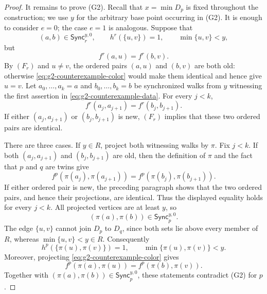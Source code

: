 \documentclass{amsart}
\numberwithin{equation}{section}
\theoremstyle{definition}
\theoremstyle{remark}
\begin{document}
\begin{proof}
It remains to prove (G2).  Recall that $x=\min D_p$ is fixed throughout
the construction; we use $y$ for the arbitrary base point occurring
in (G2).  It is enough to consider $e=0$; the case $e=1$ is analogous.
Suppose that
\begin{equation}\label{eq:g2-counterexample-data}
 (a,b)\in\mathsf{Sync}^{y,0}_r,\qquad h^r(\{u,v\})=1,\qquad
 \min\{u,v\}<y,
\end{equation}
but
\begin{equation}\label{eq:g2-counterexample-color}
 f^r(a,u)=f^r(b,v).
\end{equation}
By $(F_r)$ and $u\ne v$, the ordered pairs $(a,u)$ and $(b,v)$ are
both old: otherwise \eqref{eq:g2-counterexample-color} would make them
identical and hence give $u=v$.
Let $a_0,\ldots,a_k=a$ and $b_0,\ldots,b_k=b$ be synchronized walks
from $y$ witnessing the first assertion in
\eqref{eq:g2-counterexample-data}.  For every $j<k$,
\begin{displaymath}
 f^r(a_j,a_{j+1})=f^r(b_j,b_{j+1}).
\end{displaymath}
If either $(a_j,a_{j+1})$ or $(b_j,b_{j+1})$ is new, $(F_r)$ implies
that these two ordered pairs are identical.

There are three cases.  If $y\in R$, project both witnessing walks by
$\pi$.  Fix $j<k$.  If both $(a_j,a_{j+1})$ and
$(b_j,b_{j+1})$ are old, then the definition of $\pi$ and the fact that
$p$ and $q$ are twins give
\begin{displaymath}
 f^p(\pi(a_j),\pi(a_{j+1}))
 =f^p(\pi(b_j),\pi(b_{j+1})).
\end{displaymath}
If either ordered pair is new, the preceding paragraph shows that the
two ordered pairs, and hence their projections, are identical.  Thus
the displayed equality holds for every $j<k$.  All projected vertices
are at least $y$, so
\begin{displaymath}
 (\pi(a),\pi(b))\in\mathsf{Sync}^{y,0}_p.
\end{displaymath}
The edge $\{u,v\}$ cannot join $D_p$ to $D_q$, since both sets lie
above every member of $R$, whereas $\min\{u,v\}<y\in R$.  Consequently
\begin{displaymath}
 h^p(\{\pi(u),\pi(v)\})=1,
 \qquad \min\{\pi(u),\pi(v)\}<y.
\end{displaymath}
Moreover, projecting \eqref{eq:g2-counterexample-color} gives
\begin{displaymath}
 f^p(\pi(a),\pi(u))=f^p(\pi(b),\pi(v)).
\end{displaymath}
Together with
$(\pi(a),\pi(b))\in\mathsf{Sync}^{y,0}_p$, these statements contradict
(G2) for $p$.


\end{proof}
\end{document}
